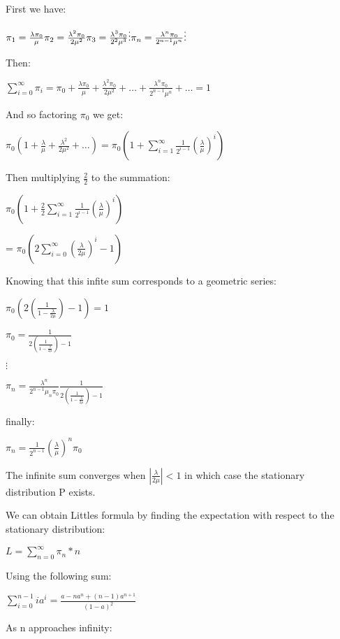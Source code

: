 \documentclass[]{article}
\begin{document}
First we have:

\(\pi_1 = \frac{\lambda \pi_0}{\mu} \\ \pi_2 = \frac{\lambda^2 \pi_0}{2 \mu^2} \\ \pi_3 = \frac{\lambda^3 \pi_0}{2^2 \mu^3} \\ \vdots \\ \pi_n = \frac{\lambda^n \pi_0}{2^{n-1} \mu^n} \\ \vdots\)

Then:

\(\sum_{i=0}^{\infty} \pi_i = \pi_0 + \frac{\lambda \pi_0}{\mu} + \frac{\lambda^2 \pi_0}{2 \mu^2} + \dots + \frac{\lambda^n \pi_0}{2^{n-1} \mu^n} + \dots = 1\)

And so factoring \(\pi_0\) we get:

\(\pi_0 (1 + \frac{\lambda}{\mu} + \frac{\lambda^2}{2 \mu^2} + \dots) = \pi_0 (1 + \sum_{i=1}^{\infty} \frac{1}{2^{i-1}} (\frac{\lambda}{\mu})^{i})\)

Then multiplying \(\frac{2}{2}\) to the summation:

\(\pi_0 (1 + \frac{2}{2} \sum_{i=1}^{\infty} \frac{1}{2^{i-1}} (\frac{\lambda}{\mu})^{i})\)

= \(\pi_0 (2 \sum_{i=0}^{\infty} (\frac{\lambda}{2 \mu})^{i} - 1)\)

Knowing that this infite sum corresponds to a geometric series:

\(\pi_0 (2 (\frac{1}{1 - \frac{\lambda}{2 \mu}}) - 1) = 1\)

\(\pi_0 = \frac{1}{2 (\frac{1}{1 - \frac{\lambda}{2 \mu}}) - 1}\)

\(\vdots\)

\(\pi_n = \frac{\lambda^n}{2^{n-1}{\mu_n} \pi_0} \frac{1}{2 (\frac{1}{1 - \frac{\lambda}{2 \mu}}) - 1}\)

finally:

\(\pi_n = \frac{1}{2^{n-1}} (\frac{\lambda}{\mu})^{n} \pi_0\)

The infinite sum converges when \(|\frac{\lambda}{2 \mu}| < 1\) in which
case the stationary distribution P exists.

We can obtain Littles formula by finding the expectation with respect to
the stationary distribution:

\(L = \sum_{n=0}^{\infty} \pi_n * n\)

Using the following sum:

\(\sum_{i=0}^{n-1} i a^i = \frac{a - na^n + (n-1)a^{n+1}}{(1-a)^2}\)

As n approaches infinity:
\end{document}
